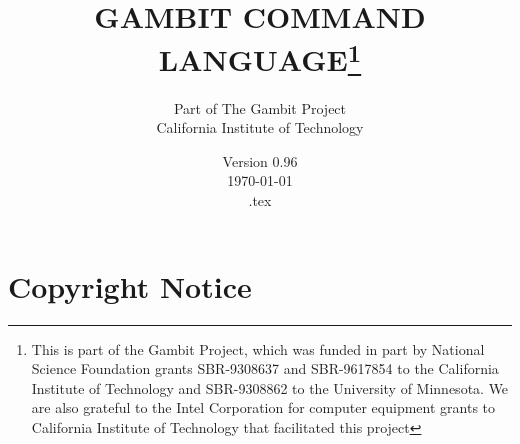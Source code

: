 %
%
%


\renewcommand{\baselinestretch}{.9}
\newcommand{\bd}{\begin{description}}
\newcommand{\ed}{\end{description}}

\newcommand{\tindex}[1]{{\tt #1}\index{{\tt #1}}}
\newcommand{\bindex}[1]{{\bf #1}\index{#1}}
\newcommand{\rindex}[1]{{#1}\index{#1}}
\makeindex


\newcommand{\lex}[1]{\mark{#1}\index{{\tt #1}}}

\makeatletter
\def\ps@lexicon{\def\@oddhead{\slshape\mysectionname\hfil 
{\Large\verb+\botmark+}\quad\thepage}
\def\@evenhead{\thepage\quad{\Large\verb+\firstmark+}\hfil \slshape\mysectionname}}
\makeatother

\newcommand{\mysectionname}{\thesection\,\, BUILT-IN FUNCTIONS}






\title{GAMBIT COMMAND LANGUAGE\thanks{This is part of the Gambit
Project, which was funded in part by National Science Foundation
grants SBR-9308637 and SBR-9617854 to the California Institute of
Technology and SBR-9308862 to the University of Minnesota.  We are
also grateful to the Intel Corporation for computer equipment grants
to California Institute of Technology that facilitated this project}}

\author{Part of The Gambit Project\\California Institute of Technology}
\date{Version 0.96\\ \today\\ \jobname.tex}

\maketitle

\tableofcontents

\chapter*{Copyright Notice}
\pagestyle{myheadings}

